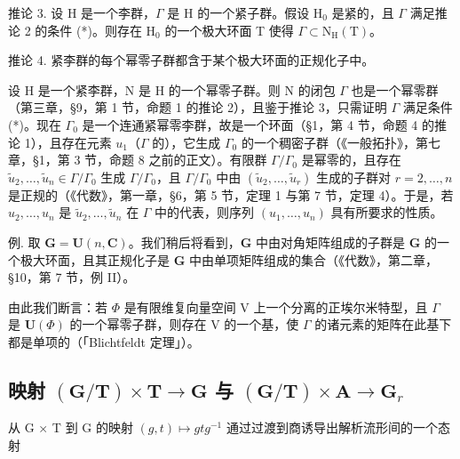 推论 3. 设 H 是一个李群，\(\Gamma\) 是 H 的一个紧子群。假设 \(\mathrm{H}_0\) 是紧的，且 \(\Gamma\) 满足推论 2 的条件 (*)。则存在 \(\mathrm{H}_0\) 的一个极大环面 T 使得 \(\Gamma \subset \mathrm{N}_{\mathrm{H}}(\mathrm{T})\)。

推论 4. 紧李群的每个幂零子群都含于某个极大环面的正规化子中。

设 H 是一个紧李群，N 是 H 的一个幂零子群。则 N 的闭包 \(\varGamma\) 也是一个幂零群（第三章，§9，第 1 节，命题 1 的推论 2），且鉴于推论 3，只需证明 \(\varGamma\) 满足条件 (*)。现在 \(\varGamma_{0}\) 是一个连通紧幂零李群，故是一个环面（§1，第 4 节，命题 4 的推论 1），且存在元素 \(u_{1}\)（\(\varGamma\) 的），它生成 \(\varGamma_{0}\) 的一个稠密子群（《一般拓扑》，第七章，§1，第 3 节，命题 8 之前的正文）。有限群 \(\varGamma/\varGamma_{0}\) 是幂零的，且存在 \(\tilde{u}_{2},\ldots,\tilde{u}_{n}\in\varGamma/\varGamma_{0}\) 生成 \(\varGamma/\varGamma_{0}\)，且 \(\varGamma/\varGamma_{0}\) 中由 \((\tilde{u}_{2},\ldots,\tilde{u}_{r})\) 生成的子群对 \(r=2,\ldots,n\) 是正规的（《代数》，第一章，§6，第 5 节，定理 1 与第 7 节，定理 4）。于是，若 \(u_{2},\ldots,u_{n}\) 是 \(\tilde{u}_{2},\ldots,\tilde{u}_{n}\) 在 \(\varGamma\) 中的代表，则序列 \((u_{1},\ldots,u_{n})\) 具有所要求的性质。

例. 取 \(\mathbf{G} = \mathbf{U}(n,\mathbf{C})\)。我们稍后将看到，\(\mathbf{G}\) 中由对角矩阵组成的子群是 \(\mathbf{G}\) 的一个极大环面，且其正规化子是 \(\mathbf{G}\) 中由单项矩阵组成的集合（《代数》，第二章，§10，第 7 节，例 II）。

由此我们断言：若 \(\Phi\) 是有限维复向量空间 V 上一个分离的正埃尔米特型，且 \(\Gamma\) 是 \(\mathbf{U}(\Phi)\) 的一个幂零子群，则存在 V 的一个基，使 \(\Gamma\) 的诸元素的矩阵在此基下都是单项的（「Blichtfeldt 定理」）。

\subsection{\texorpdfstring{映射 \((\mathbf{G} / \mathbf{T})\times \mathbf{T}\to \mathbf{G}\) 与 \((\mathbf{G} / \mathbf{T})\times \mathbf{A}\rightarrow \mathbf{G}_r\)}{映射 (\textbackslash mathbf\{G\} / \textbackslash mathbf\{T\})\textbackslash times \textbackslash mathbf\{T\}\textbackslash to \textbackslash mathbf\{G\} 与 (\textbackslash mathbf\{G\} / \textbackslash mathbf\{T\})\textbackslash times \textbackslash mathbf\{A\}\textbackslash rightarrow \textbackslash mathbf\{G\}\_r}}

从 G × T 到 G 的映射 \((g,t)\mapsto gtg^{-1}\) 通过过渡到商诱导出解析流形间的一个态射

